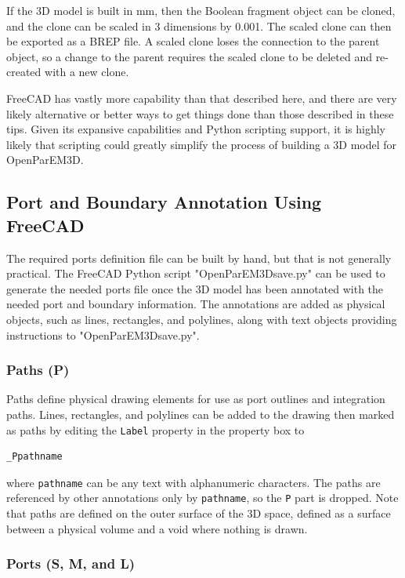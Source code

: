 \documentclass[titlepage]{article}
\renewcommand\_{\textunderscore\linebreak[1]}
\begin{document}
If the 3D model is built in mm, then the Boolean fragment object can be cloned, and the clone can be scaled in 3 dimensions by 0.001.  The scaled clone can then be exported as a BREP file.  A scaled clone loses the connection to the parent object, so a change to the parent requires the scaled clone to be deleted and re-created with a new clone.

FreeCAD has vastly more capability than that described here, and there are very likely alternative or better ways to get things done than those described in these tips.  Given its expansive capabilities and Python scripting support, it is highly likely that scripting could greatly simplify the process of building a 3D model for OpenParEM3D.

\subsection{Port and Boundary Annotation Using FreeCAD}

The required ports definition file can be built by hand, but that is not generally practical.  The FreeCAD Python script "OpenParEM3D\_save.py" can be used to generate the needed ports file once the 3D model has been annotated with the needed port and boundary information.  The annotations are added as physical objects, such as lines, rectangles, and polylines, along with text objects providing instructions to "OpenParEM3D\_save.py". 

\subsubsection{Paths (\_P)}
\label{sec:paths}

Paths define physical drawing elements for use as port outlines and integration paths.  Lines, rectangles, and polylines can be added to the drawing then marked as paths by editing the \texttt{Label} property in the property box to
\begin{Verbatim}[fontsize=\small]
  _Ppathname
\end{Verbatim}
\noindent where \texttt{pathname} can be any text with alphanumeric characters.  The paths are referenced by other annotations only by \texttt{pathname}, so the \texttt{\_P} part is dropped.  Note that paths are defined on the outer surface of the 3D space, defined as a surface between a physical volume and a void where nothing is drawn.

\subsubsection{Ports (\_S, \_M, and \_L)}
\label{sec:ports}
\end{document}
